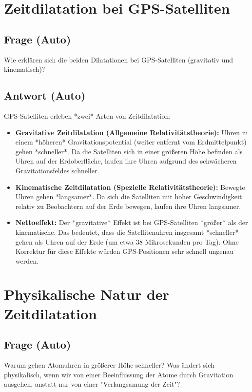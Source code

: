 \documentclass{article}
\begin{document}
	\section{Zeitdilatation bei GPS-Satelliten}
	
	\subsection{Frage (Auto)}
	Wie erklären sich die beiden Dilatationen bei GPS-Satelliten (gravitativ und kinematisch)?
	
	\subsection{Antwort (Auto)}
	GPS-Satelliten erleben *zwei* Arten von Zeitdilatation:
	\begin{itemize}
		\item \textbf{Gravitative Zeitdilatation (Allgemeine Relativitätstheorie):} Uhren in einem *höheren* Gravitationspotential (weiter entfernt vom Erdmittelpunkt) gehen *schneller*. Da die Satelliten sich in einer größeren Höhe befinden als Uhren auf der Erdoberfläche, laufen ihre Uhren aufgrund des schwächeren Gravitationsfeldes schneller.
		\item \textbf{Kinematische Zeitdilatation (Spezielle Relativitätstheorie):} Bewegte Uhren gehen *langsamer*. Da sich die Satelliten mit hoher Geschwindigkeit relativ zu Beobachtern auf der Erde bewegen, laufen ihre Uhren langsamer.
		\item \textbf{Nettoeffekt:} Der *gravitative* Effekt ist bei GPS-Satelliten *größer* als der kinematische.  Das bedeutet, dass die Satellitenuhren insgesamt *schneller* gehen als Uhren auf der Erde (um etwa 38 Mikrosekunden pro Tag).  Ohne Korrektur für diese Effekte würden GPS-Positionen sehr schnell ungenau werden.
	\end{itemize}
	
	\section{Physikalische Natur der Zeitdilatation}
	
	\subsection{Frage (Auto)}
	Warum gehen Atomuhren in größerer Höhe schneller? Was ändert sich physikalisch, wenn wir von einer Beeinflussung der Atome durch Gravitation ausgehen, anstatt nur von einer "Verlangsamung der Zeit"?
	
\end{document}

